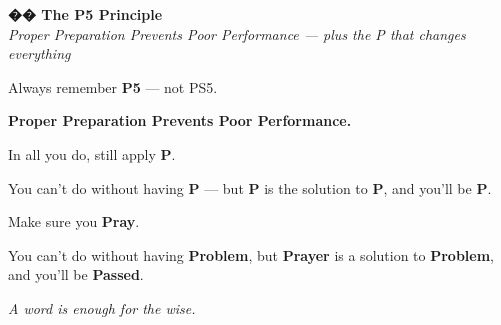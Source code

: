 \documentclass[11pt,a4paper]{article}
\begin{document}
\begin{mindsetbox}
    \textbf{\color{primary}\Large �� The P5 Principle}\\[0.3em]
    {\color{textGray}\itshape Proper Preparation Prevents Poor Performance --- plus the P that changes everything}

    \vspace{1em}

    Always remember \textbf{P5} --- not PS5.

    \vspace{0.5em}

    \begin{center}
        {\color{primary}\Large\bfseries Proper Preparation Prevents Poor Performance.}
    \end{center}

    \vspace{0.5em}

    In all you do, still apply \textbf{P}.

    \vspace{0.5em}

    \begin{successbox}
        You can't do without having \textbf{P} --- but \textbf{P} is the solution to \textbf{P}, and you'll be \textbf{P}.

        \vspace{0.5em}

        Make sure you \textbf{Pray}.

        \vspace{0.5em}

        You can't do without having \textbf{Problem}, but \textbf{Prayer} is a solution to \textbf{Problem}, and you'll be \textbf{Passed}.
    \end{successbox}

    \vspace{0.5em}

    {\color{primary}\itshape A word is enough for the wise.}
\end{mindsetbox}
\end{document}
